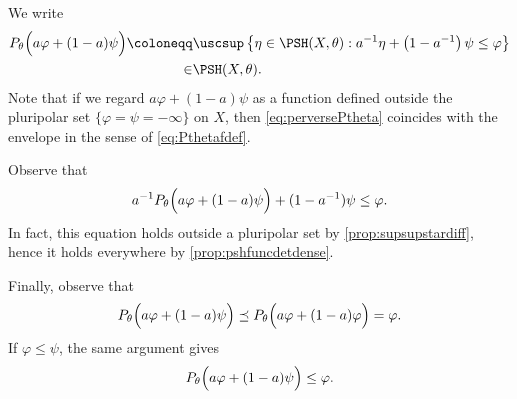 We write
\begin{equation}\label{eq:perversePtheta}
    \begin{aligned}
    P_{\theta}\Bigl(a\varphi+(1-a)\psi\Bigr)\coloneqq  &\uscsup\left\{\eta\in \PSH(X,\theta): a^{-1}\eta+\left(1-a^{-1}\right)\psi  \leq  \varphi \right\}\\
    \in & \PSH(X,\theta).
    \end{aligned}
\end{equation}
Note that if we regard $a\varphi+(1-a)\psi$ as a function defined outside the pluripolar set $\{\varphi=\psi=-\infty\}$ on $X$, then \eqref{eq:perversePtheta} coincides with the envelope in the sense of \eqref{eq:Pthetafdef}.

Observe that
\begin{equation}\label{eq:P_path_everywhere_ineq}
a^{-1}P_{\theta}\Bigl(a\varphi+(1-a)\psi \Bigr)+(1-a^{-1})\psi\leq \varphi.
\end{equation}
In fact, this equation holds outside a pluripolar set by \cref{prop:supsupstardiff}, hence it holds everywhere by \cref{prop:pshfuncdetdense}.

Finally, observe that
\[
P_{\theta}\Bigl(a\varphi+(1-a)\psi\Bigr)\preceq P_{\theta}\Bigl(a\varphi+(1-a)\varphi\Bigr)=\varphi.
\]
If $\varphi\leq \psi$, the same argument gives
\[
P_{\theta}\Bigl(a\varphi+(1-a)\psi\Bigr)\leq\varphi.
\]


